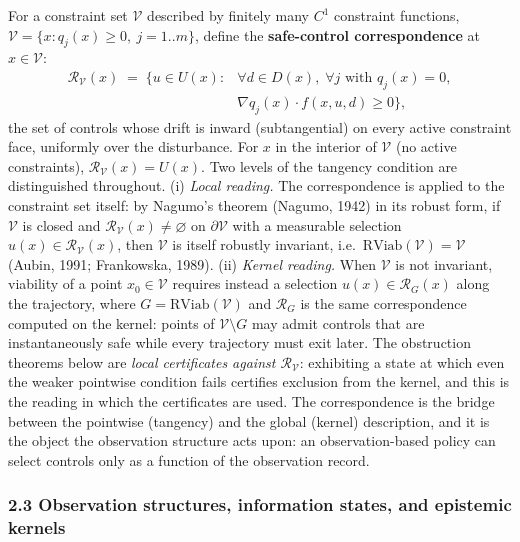 \documentclass[10pt,twocolumn]{article}
\theoremstyle{definition}
\begin{document}
For a constraint set \(\mathcal{V}\) described by finitely many \(C^1\)
constraint functions,
\(\mathcal{V} = \{ x : q_j(x) \ge 0,\ j = 1..m \}\), define the
\textbf{safe-control correspondence} at \(x \in \mathcal{V}\):
\[
\begin{aligned}
\mathcal{R}_{\mathcal{V}}(x) \;=\; \bigl\{ u \in U(x) : {}& \forall d \in D(x),\; \forall j \text{ with } q_j(x) = 0,\\
& \nabla q_j(x) \cdot f(x, u, d) \ge 0 \bigr\},
\end{aligned}
\]
the set of controls whose drift is inward (subtangential) on every
active constraint face, uniformly over the disturbance. For \(x\) in the
interior of \(\mathcal{V}\) (no active constraints),
\(\mathcal{R}_{\mathcal{V}}(x) = U(x)\). Two levels of the tangency condition are distinguished throughout. (i) \emph{Local reading.} The correspondence is applied to the constraint set itself: by Nagumo's theorem (Nagumo, 1942) in its robust form, if \(\mathcal{V}\) is closed and
\(\mathcal{R}_{\mathcal{V}}(x) \neq \varnothing\) on
\(\partial\mathcal{V}\) with a measurable selection
\(u(x) \in \mathcal{R}_{\mathcal{V}}(x)\), then \(\mathcal{V}\) is
itself robustly invariant,
i.e.~\(\mathrm{RViab}(\mathcal{V}) = \mathcal{V}\) (Aubin, 1991;
Frankowska, 1989). (ii) \emph{Kernel reading.} When \(\mathcal{V}\) is not invariant, viability of a point \(x_0 \in \mathcal{V}\) requires instead a selection \(u(x) \in \mathcal{R}_G(x)\) along the trajectory, where \(G = \mathrm{RViab}(\mathcal{V})\) and \(\mathcal{R}_G\) is the same correspondence computed on the kernel: points of
\(\mathcal{V} \setminus G\) may admit controls that are instantaneously
safe while every trajectory must exit later. The obstruction
theorems below are \emph{local certificates against
\(\mathcal{R}_{\mathcal{V}}\)}: exhibiting a state at which even the
weaker pointwise condition fails certifies exclusion from the kernel,
and this is the reading in which the certificates are used. The
correspondence is the bridge between the pointwise (tangency) and the
global (kernel) description, and it is the object the observation
structure acts upon: an observation-based policy can select controls
only as a function of the observation record.

\subsubsection{2.3 Observation structures, information states, and
epistemic
kernels}\label{calc-observation-structures-information-states-and-epistemic-kernels}
\end{document}
